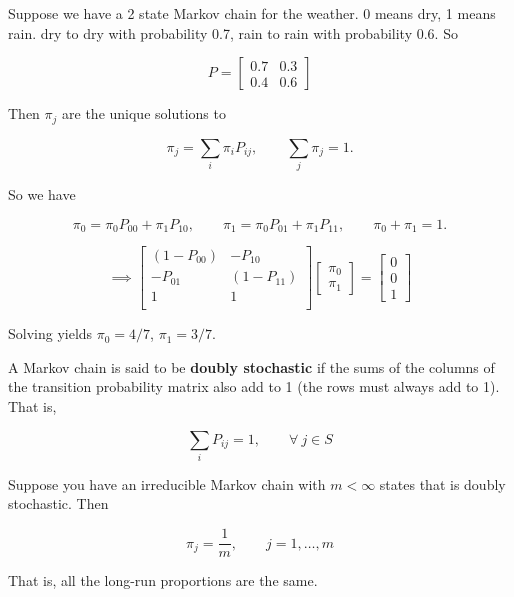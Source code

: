\begin{example} Suppose we have a 2 state Markov chain for the weather. 0 means dry, 1 means rain.  dry to dry with probability 0.7, rain to rain with probability 0.6. So 

\[
P = \begin{bmatrix}
0.7 & 0.3 \\
0.4 & 0.6
\end{bmatrix}
\]

Then \(\pi_j\) are the unique solutions to

\[
\pi_j = \sum_i \pi_i P_{ij}, \qquad \sum_j \pi_j = 1.
\]

So we have

\[
\pi_0 = \pi_0 P_{00} + \pi_1 P_{10}, \qquad \pi_1 = \pi_0 P_{01} + \pi_1 P_{11}, \qquad \pi_0 + \pi_1 = 1.
\]

\[
\implies \begin{bmatrix}
(1 - P_{00}) & - P_{10} \\
-P_{01} & (1 - P_{11}) \\
1 & 1 \\ 
\end{bmatrix} \begin{bmatrix} \pi_0 \\ \pi_1 \end{bmatrix} = \begin{bmatrix} 0 \\ 0 \\ 1\end{bmatrix}
\]

Solving yields \(\pi_0 = 4/7\), \(\pi_1 = 3/7\).

\end{example}

\begin{definition}A Markov chain is said to be \textbf{doubly stochastic} if the sums of the columns of the transition probability matrix also add to 1 (the rows must always add to 1). That is,

\[
\sum_i P_{ij} = 1, \qquad \forall \ j \in S
\]

\end{definition}

\begin{proposition}
Suppose you have an irreducible Markov chain with \(m < \infty\) states that is doubly stochastic. Then 

\[
\pi_j = \frac{1}{m}, \qquad j = 1, \ldots, m
\]

That is, all the long-run proportions are the same.
\end{proposition}

